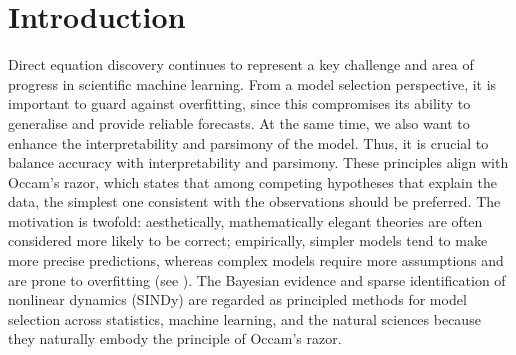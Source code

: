 \section{Introduction}
\label{sec:intro}

Direct equation discovery continues to represent a key challenge and area of progress in scientific machine learning.
From a model selection perspective, it is important to guard against overfitting, since this compromises its ability to generalise and provide reliable forecasts. At the same time, we also want to enhance the interpretability and parsimony of the model. Thus, it is crucial to balance accuracy with interpretability and parsimony. These principles align with Occam’s razor, which states that among competing hypotheses that explain the data, the simplest one consistent with the observations should be preferred. 
The motivation is twofold: aesthetically, mathematically elegant theories are often considered more likely to be correct; empirically, simpler models tend to make more precise predictions, whereas complex models require more assumptions and are prone to overfitting (see \cite{mackay2003}). The Bayesian evidence and sparse identification of nonlinear dynamics (SINDy) are regarded as principled methods for model selection across statistics, machine learning, and the natural sciences because they naturally embody the principle of Occam’s razor.


